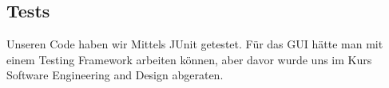 \subsection{Tests}
Unseren Code haben wir Mittels JUnit getestet. Für das GUI hätte man mit einem Testing Framework arbeiten können, aber davor wurde uns im
Kurs Software Engineering and Design abgeraten.
